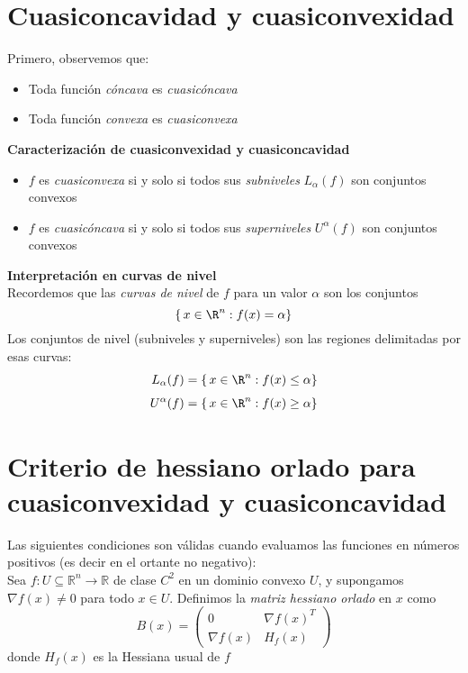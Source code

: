 \documentclass{article}
\begin{document}
\section*{Cuasiconcavidad y cuasiconvexidad}

\noindent Primero, observemos que:
\begin{itemize}
  \item Toda función \emph{cóncava} es \emph{cuasicóncava}
  \item Toda función \emph{convexa} es \emph{cuasiconvexa}
\end{itemize}












\noindent\textbf{Caracterización de cuasiconvexidad y cuasiconcavidad}
\begin{itemize}
  \item \color{teal}\(f\) es \emph{cuasiconvexa} si y solo si todos sus \emph{subniveles} \(L_\alpha(f)\) son conjuntos convexos
  \item \color{teal}\(f\) es \emph{cuasicóncava} si y solo si todos sus \emph{superniveles} \(U^\alpha(f)\) son conjuntos convexos
\end{itemize}

\noindent\textbf{Interpretación en curvas de nivel}\\
Recordemos que las \emph{curvas de nivel} de \(f\) para un valor \(\alpha\) son los conjuntos
\[
\{\,x\in\R^n : f(x)=\alpha\}
\]
Los conjuntos de nivel (subniveles y superniveles) son las regiones delimitadas por esas curvas:
\[
\begin{aligned}
L_\alpha(f) &= \{\,x\in\R^n : f(x)\le \alpha\}\\[4pt]
U^\alpha(f) &= \{\,x\in\R^n : f(x)\ge \alpha\}
\end{aligned}
\]

\section*{Criterio de hessiano orlado para cuasiconvexidad y cuasiconcavidad}
Las siguientes condiciones son válidas cuando evaluamos las funciones en números positivos (es decir en el ortante no negativo):\\
Sea \(f\colon U\subseteq\mathbb{R}^n\to\mathbb{R}\) de clase \(C^2\) en un dominio convexo \(U\), y supongamos \(\nabla f(x)\neq0\) para todo \(x\in U\). Definimos la \emph{matriz hessiano orlado} en \(x\) como
\[
B(x)
=\begin{pmatrix}
0 & \nabla f(x)^T \\[4pt]
\nabla f(x) & H_f(x)
\end{pmatrix}
\]
donde \(H_f(x)\) es la Hessiana usual de \(f\)
\end{document}
